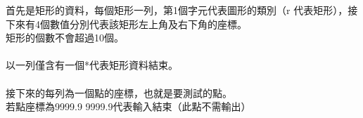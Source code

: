 首先是矩形的資料，每個矩形一列，第1個字元代表圖形的類別（r 代表矩形），接下來有4個數值分別代表該矩形左上角及右下角的座標。\\
矩形的個數不會超過10個。\\
\\
以一列僅含有一個*代表矩形資料結束。\\
\\
接下來的每列為一個點的座標，也就是要測試的點。\\
若點座標為9999.9 9999.9代表輸入結束（此點不需輸出）